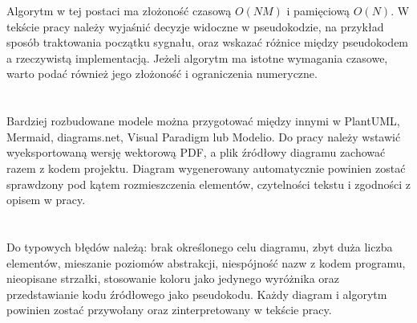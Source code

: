 Algorytm w tej postaci ma złożoność czasową $O(NM)$ i pamięciową $O(N)$. W tekście
pracy należy wyjaśnić decyzje widoczne w pseudokodzie, na przykład sposób traktowania
początku sygnału, oraz wskazać różnice między pseudokodem a rzeczywistą implementacją.
Jeżeli algorytm ma istotne wymagania czasowe, warto podać również jego złożoność i
ograniczenia numeryczne.

\section{}

Bardziej rozbudowane modele można przygotować między innymi w PlantUML, Mermaid,
diagrams.net, Visual Paradigm lub Modelio. Do pracy należy wstawić wyeksportowaną wersję
wektorową PDF, a plik źródłowy diagramu zachować razem z kodem projektu. Diagram
wygenerowany automatycznie powinien zostać sprawdzony pod kątem rozmieszczenia elementów,
czytelności tekstu i zgodności z opisem w pracy.

\section{}

Do typowych błędów należą: brak określonego celu diagramu, zbyt duża liczba elementów,
mieszanie poziomów abstrakcji, niespójność nazw z kodem programu, nieopisane strzałki,
stosowanie koloru jako jedynego wyróżnika oraz przedstawianie kodu źródłowego jako
pseudokodu. Każdy diagram i algorytm powinien zostać przywołany oraz zinterpretowany
w tekście pracy.
